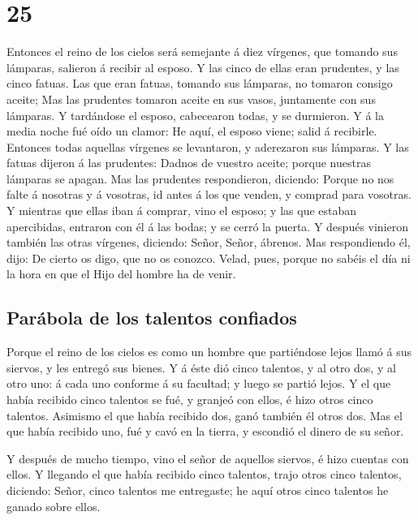 \hypertarget{section-24}{%
\section{25}\label{section-24}}

 Entonces el reino de los cielos será semejante á diez
vírgenes, que tomando sus lámparas, salieron á recibir al esposo.
 Y las cinco de ellas eran prudentes, y las cinco fatuas.
 Las que eran fatuas, tomando sus lámparas, no tomaron
consigo aceite;  Mas las prudentes tomaron aceite en sus
vasos, juntamente con sus lámparas.  Y tardándose el esposo,
cabecearon todas, y se durmieron.  Y á la media noche fué
oído un clamor: He aquí, el esposo viene; salid á recibirle.
 Entonces todas aquellas vírgenes se levantaron, y
aderezaron sus lámparas.  Y las fatuas dijeron á las
prudentes: Dadnos de vuestro aceite; porque nuestras lámparas se apagan.
 Mas las prudentes respondieron, diciendo: Porque no nos
falte á nosotras y á vosotras, id antes á los que venden, y comprad para
vosotras.  Y mientras que ellas iban á comprar, vino el
esposo; y las que estaban apercibidas, entraron con él á las bodas; y se
cerró la puerta.  Y después vinieron también las otras
vírgenes, diciendo: Señor, Señor, ábrenos.  Mas
respondiendo él, dijo: De cierto os digo, que no os conozco.
 Velad, pues, porque no sabéis el día ni la hora en que el
Hijo del hombre ha de venir.

\hypertarget{paruxe1bola-de-los-talentos-confiados}{%
\subsection{Parábola de los talentos
confiados}\label{paruxe1bola-de-los-talentos-confiados}}

 Porque el reino de los cielos es como un hombre que
partiéndose lejos llamó á sus siervos, y les entregó sus bienes.
 Y á éste dió cinco talentos, y al otro dos, y al otro uno:
á cada uno conforme á su facultad; y luego se partió lejos.
 Y el que había recibido cinco talentos se fué, y granjeó
con ellos, é hizo otros cinco talentos.  Asimismo el que
había recibido dos, ganó también él otros dos.  Mas el que
había recibido uno, fué y cavó en la tierra, y escondió el dinero de su
señor.

 Y después de mucho tiempo, vino el señor de aquellos
siervos, é hizo cuentas con ellos.  Y llegando el que había
recibido cinco talentos, trajo otros cinco talentos, diciendo: Señor,
cinco talentos me entregaste; he aquí otros cinco talentos he ganado
sobre ellos.

